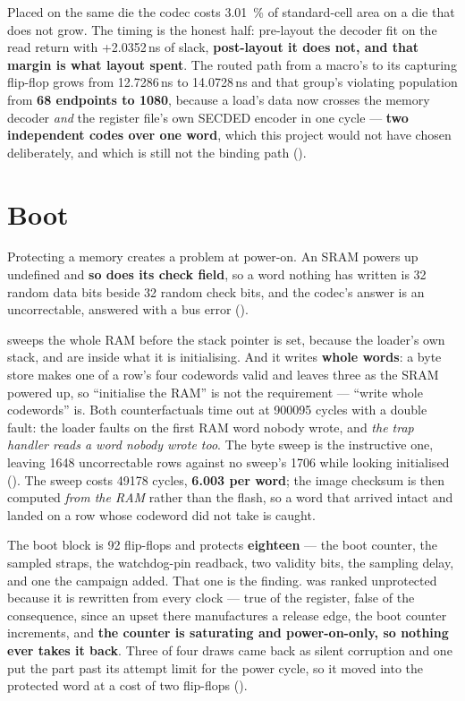 Placed on the same die the codec costs \SI{+3.01}{\percent} of
standard-cell area on a die that does not grow. The timing is the honest
half: pre-layout the decoder fit on the read return with
+2.0352\,ns of slack, \textbf{post-layout it does not,
and that margin is what layout spent}. The routed path from a macro's
 to its capturing flip-flop grows from
12.7286\,ns to 14.0728\,ns and that
group's violating population from \textbf{68 endpoints to \num{1080}},
because a load's data now crosses the memory decoder \emph{and} the
register file's own SECDED encoder in one cycle --- \textbf{two
independent codes over one word}, which this project would not have
chosen deliberately, and which is still not the binding path
().

\section{Boot}
\label{sec:harden-boot}

Protecting a memory creates a problem at power-on. An SRAM powers up
undefined and \textbf{so does its check field}, so a word nothing has
written is 32 random data bits beside 32 random check bits, and the
codec's answer is an uncorrectable, answered with a bus error
().

 sweeps the whole RAM before the stack pointer is
set, because the loader's own stack,  and  are
inside what it is initialising. And it writes \textbf{whole words}: a
byte store makes one of a row's four codewords valid and leaves three as
the SRAM powered up, so ``initialise the RAM'' is not the requirement
--- ``write whole codewords'' is. Both counterfactuals time out at
\num{900095} cycles with a double fault: the loader faults on the first
RAM word nobody wrote, and \emph{the trap handler reads a word nobody
wrote too}. The byte sweep is the instructive one,
leaving \num{1648} uncorrectable rows against no sweep's \num{1706}
while looking initialised (). The sweep costs
\num{49178} cycles, \textbf{6.003 per word}; the image checksum is then
computed \emph{from the RAM} rather than the flash, so a word that
arrived intact and landed on a row whose codeword did not take is
caught.

The boot block is 92 flip-flops and  protects \textbf{eighteen}
--- the boot counter, the sampled straps, the watchdog-pin readback, two
validity bits, the sampling delay, and one the campaign added. That one
is the finding.  was ranked unprotected because it is
rewritten from  every clock --- true of the register,
false of the consequence, since an upset there manufactures a release
edge, the boot counter increments, and \textbf{the counter is saturating
and power-on-only, so nothing ever takes it back}. Three of four draws
came back as silent corruption and one put the part past its attempt
limit for the power cycle, so it moved into the protected word at a cost
of two flip-flops ().

